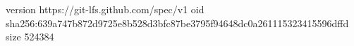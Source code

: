version https://git-lfs.github.com/spec/v1
oid sha256:639a747b872d9725e8b528d3bfc87be3795f94648dc0a261115323415596dffd
size 524384
